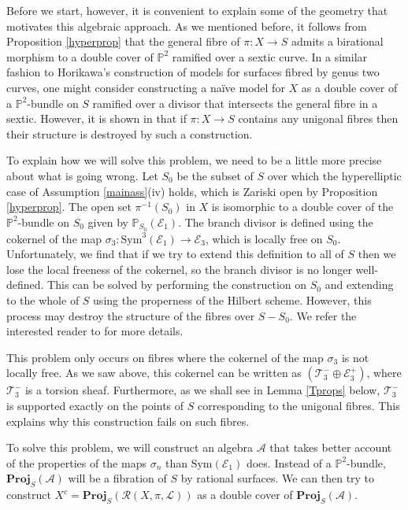 \documentclass{amsart}
\begin{document}
Before we start, however, it is convenient to explain some of the geometry that motivates this algebraic approach. As we mentioned before, it follows from Proposition \ref{hyperprop} that the general fibre of $\pi\colon X \to S$ admits a birational morphism to a double cover of ${\mathbb{P}}^2$ ramified over a sextic curve. In a similar fashion to Horikawa's \cite{oaspcg2} construction of models for surfaces fibred by genus two curves, one might consider constructing a na\"{i}ve model for $X$ as a double cover of a ${\mathbb{P}}^2$-bundle on $S$ ramified over a divisor that intersects the general fibre in a sextic. However, it is shown in \cite[Example 2.1.1]{mythesis} that if $\pi\colon X \to S$ contains any unigonal fibres then their structure is destroyed by such a construction.

To explain how we will solve this problem, we need to be a little more precise about what is going wrong. Let $S_0$ be the subset of $S$ over which the hyperelliptic case of Assumption \ref{mainass}(iv) holds, which is Zariski open by Proposition \ref{hyperprop}. The open set $\pi^{-1}(S_0)$ in $X$ is isomorphic to a double cover of the ${\mathbb{P}}^2$-bundle on $S_0$ given by  ${\mathbb{P}}_{S_0}({\mathcal{E}}_1)$. The branch divisor is defined using the cokernel of the map $\sigma_3\colon {\mathrm{Sym}}^3({\mathcal{E}}_1) \to {\mathcal{E}}_3$, which is locally free on $S_0$. Unfortunately, we find that if we try to extend this definition to all of $S$ then we lose the local freeness of the cokernel, so the branch divisor is no longer well-defined. This can be solved by performing the construction on $S_0$ and extending to the whole of $S$ using the properness of the Hilbert scheme. However, this process may destroy the structure of the fibres over $S - S_0$. We refer the interested reader to \cite[Sections 1.3 and 2.1]{mythesis} for more details.

This problem only occurs on fibres where the cokernel of the map $\sigma_3$ is not locally free. As we saw above, this cokernel can be written as $({\mathcal{T}}_3^- \oplus {\mathcal{E}}_3^+)$, where ${\mathcal{T}}_3^-$ is a torsion sheaf. Furthermore, as we shall see in Lemma \ref{Tprops} below, ${\mathcal{T}}_3^-$ is supported exactly on the points of $S$ corresponding to the unigonal fibres. This explains why this construction fails on such fibres.

To solve this problem, we will construct an algebra ${\mathcal{A}}$ that takes better account of the properties of the maps $\sigma_n$ than ${\mathrm{Sym}}({\mathcal{E}}_1)$ does. Instead of a ${\mathbb{P}}^2$-bundle, $\mathbf{Proj}_S({\mathcal{A}})$ will be a fibration of $S$ by rational surfaces. We can then try to construct $X^c = \mathbf{Proj}_S({\mathcal{R}}(X,\pi,{\mathcal{L}}))$ as a double cover of $\mathbf{Proj}_S({\mathcal{A}})$.
\end{document}
